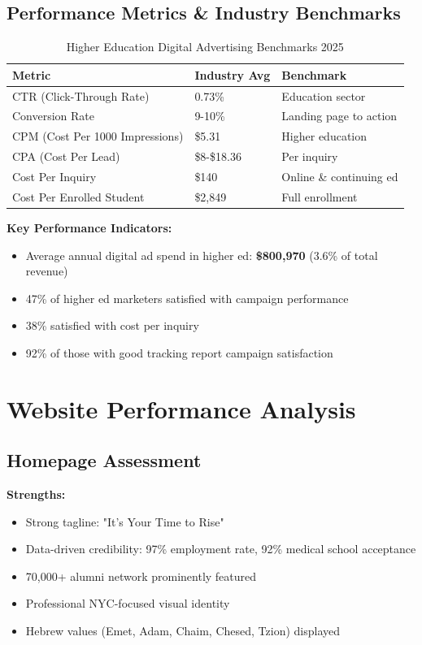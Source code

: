 \documentclass[12pt,letterpaper]{article}
\begin{document}
\subsection{Performance Metrics \& Industry Benchmarks}

\begin{table}[h]
\centering
\begin{tabular}{@{}lll@{}}
\toprule
\textbf{Metric} & \textbf{Industry Avg} & \textbf{Benchmark} \\
\midrule
CTR (Click-Through Rate) & 0.73\% & Education sector \\
Conversion Rate & 9-10\% & Landing page to action \\
CPM (Cost Per 1000 Impressions) & \$5.31 & Higher education \\
CPA (Cost Per Lead) & \$8-\$18.36 & Per inquiry \\
Cost Per Inquiry & \$140 & Online \& continuing ed \\
Cost Per Enrolled Student & \$2,849 & Full enrollment \\
\bottomrule
\end{tabular}
\caption{Higher Education Digital Advertising Benchmarks 2025}
\end{table}

\textbf{Key Performance Indicators:}
\begin{itemize}[leftmargin=*]
    \item Average annual digital ad spend in higher ed: \textbf{\$800,970} (3.6\% of total revenue)
    \item 47\% of higher ed marketers satisfied with campaign performance
    \item 38\% satisfied with cost per inquiry
    \item 92\% of those with good tracking report campaign satisfaction
\end{itemize}

\section{Website Performance Analysis}

\subsection{Homepage Assessment}

\textbf{Strengths:}
\begin{itemize}[leftmargin=*]
    \item Strong tagline: "It's Your Time to Rise"
    \item Data-driven credibility: 97\% employment rate, 92\% medical school acceptance
    \item 70,000+ alumni network prominently featured
    \item Professional NYC-focused visual identity
    \item Hebrew values (Emet, Adam, Chaim, Chesed, Tzion) displayed
\end{itemize}
\end{document}
